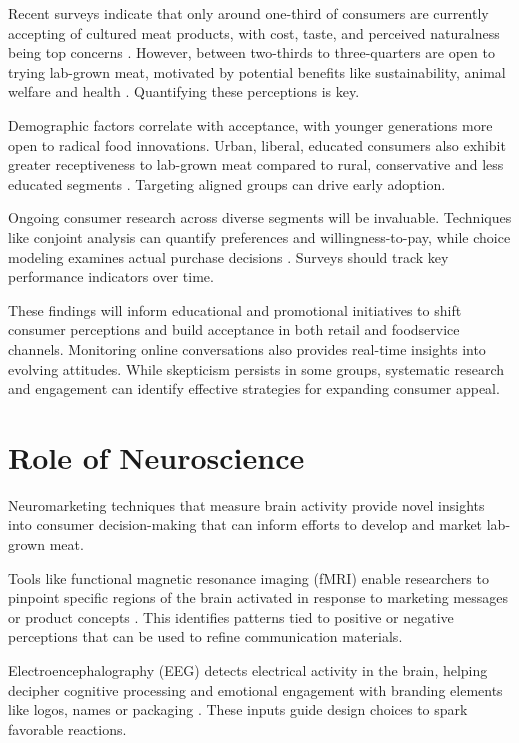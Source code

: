 \documentclass[10pt]{article}
\begin{document}
\begin{sloppypar}
  Recent surveys indicate that only around one-third of consumers are currently accepting of cultured meat products, with cost, taste, and perceived naturalness being top concerns \citep{bryant_consumer_2018}. However, between two-thirds to three-quarters are open to trying lab-grown meat, motivated by potential benefits like sustainability, animal welfare and health \citep{wilks_attitudes_2017}. Quantifying these perceptions is key.

  Demographic factors correlate with acceptance, with younger generations more open to radical food innovations. Urban, liberal, educated consumers also exhibit greater receptiveness to lab-grown meat compared to rural, conservative and less educated segments \citep{circus_exploring_2018}. Targeting aligned groups can drive early adoption.

  Ongoing consumer research across diverse segments will be invaluable. Techniques like conjoint analysis can quantify preferences and willingness-to-pay, while choice modeling examines actual purchase decisions \citep{wilks_attitudes_2017}. Surveys should track key performance indicators over time.

  These findings will inform educational and promotional initiatives to shift consumer perceptions and build acceptance in both retail and foodservice channels. Monitoring online conversations also provides real-time insights into evolving attitudes. While skepticism persists in some groups, systematic research and engagement can identify effective strategies for expanding consumer appeal.

  \section{Role of Neuroscience}
  \label{sec:role-of-neuroscience}

  Neuromarketing techniques that measure brain activity provide novel insights into consumer decision-making that can inform efforts to develop and market lab-grown meat.

  Tools like functional magnetic resonance imaging (fMRI) enable researchers to pinpoint specific regions of the brain activated in response to marketing messages or product concepts \citep{bryant_consumer_2018}. This identifies patterns tied to positive or negative perceptions that can be used to refine communication materials.

  Electroencephalography (EEG) detects electrical activity in the brain, helping decipher cognitive processing and emotional engagement with branding elements like logos, names or packaging \citep{khushaba_consumer_2013}. These inputs guide design choices to spark favorable reactions.


\end{sloppypar}
\end{document}
